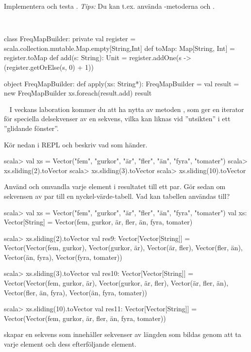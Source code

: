 \noindent Implementera och testa . \emph{Tips:} Du kan t.ex. använda -metoderna  och .

\SOLUTION

\TaskSolved \what~
\begin{Code}
class FreqMapBuilder:
  private val register = scala.collection.mutable.Map.empty[String,Int]
  def toMap: Map[String, Int] = register.toMap
  def add(s: String): Unit =
    register.addOne(s -> (register.getOrElse(s, 0) + 1))

object FreqMapBuilder:
  def apply(xs: String*): FreqMapBuilder = 
    val result = new FreqMapBuilder
    xs.foreach(result.add)
    result
\end{Code}

\QUESTEND




\QUESTBEGIN

\Task  \what~  I veckans laboration kommer du att ha nytta av metoden , som ger en iterator för speciella delsekvenser av en sekvens, vilka kan liknas vid ''utsikten'' i ett ''glidande fönster''.

\Subtask Kör nedan i REPL och beskriv vad som händer.

\begin{REPL}
scala> val xs = Vector("fem", "gurkor", "är", "fler", "än", "fyra", "tomater")
scala> xs.sliding(2).toVector
scala> xs.sliding(3).toVector
scala> xs.sliding(10).toVector
\end{REPL}

\Subtask Använd  och omvandla varje element i resultatet till ett par. Gör sedan om sekvensen av par till en nyckel-värde-tabell. Vad kan tabellen användas till?

\SOLUTION

\TaskSolved \what

\SubtaskSolved
\begin{REPL}
scala> val xs = Vector("fem", "gurkor", "är", "fler", "än", "fyra", "tomater")
val xs: Vector[String] =
  Vector(fem, gurkor, är, fler, än, fyra, tomater)

scala> xs.sliding(2).toVector
val res9: Vector[Vector[String]] =
  Vector(Vector(fem, gurkor), Vector(gurkor, är), Vector(är, fler), Vector(fler, än), Vector(än, fyra), Vector(fyra, tomater))

scala> xs.sliding(3).toVector
val res10: Vector[Vector[String]] =
  Vector(Vector(fem, gurkor, är), Vector(gurkor, är, fler), Vector(är, fler, än), Vector(fler, än, fyra), Vector(än, fyra, tomater))

scala> xs.sliding(10).toVector
val res11: Vector[Vector[String]] =
  Vector(Vector(fem, gurkor, är, fler, än, fyra, tomater))

\end{REPL}
 skapar en sekvens som innehåller sekvenser av längden  som bildas genom att ta varje element och dess  efterföljande element.

